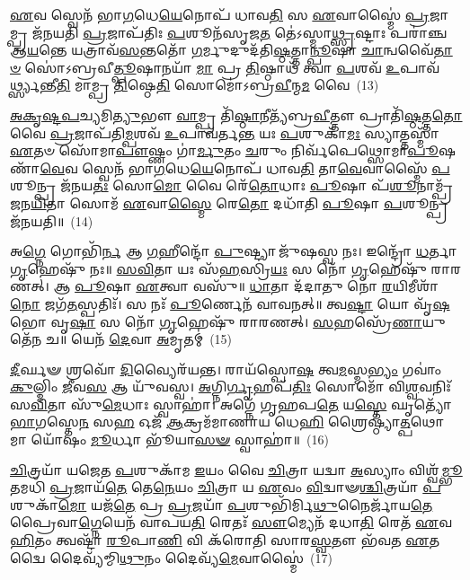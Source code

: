 \-\ul{𑌏}\-𑌵 𑌸𑍍𑌵𑍇𑌨᳴ 𑌭𑌾\-\ul{𑌗}\-𑌧𑍇\-\ul{𑌯𑍇}\-𑌨𑍋𑌪᳴ 𑌧𑌾𑌵\-\ul{𑌤𑌿} 𑌸 \ul{𑌏}\-𑌵𑌾𑌸𑍍𑌮𑍈॑ \ul{𑌪𑍍𑌰}\-𑌜𑌾𑌮𑍍𑌪𑍍𑌰 𑌜᳴𑌨𑌯𑌤𑌿 \ul{𑌪𑍍𑌰}\-𑌜𑌾𑌪᳴𑌤𑌿𑌃 \ul{𑌪}\-𑌶𑍂𑌨᳴𑌸𑍃𑌜\-\ul{𑌤} 𑌤𑍇॑\-𑌽𑌸𑍍𑌮𑌾\-\ul{𑌥𑍍𑌸𑍃}\-𑌷𑍍𑌟𑌾𑌃 𑌪𑌰𑌾॑𑌞𑍍𑌚 𑌆\-\ul{𑌯}\-𑌨𑍍𑌤𑍇 𑌯𑌤𑍍𑌰𑌾𑌵᳴\-\ul{𑌸}\-𑌨𑍍𑌤𑌤𑍋᳴ \ul{𑌗}\-𑌰𑍍𑌮𑍁𑌦𑍁𑌦᳴𑌤𑌿\-\ul{𑌷𑍍𑌠}\-𑌤𑍍𑌤𑌾\-\ul{𑌨𑍍𑌪𑍂}\-𑌷𑌾 \ul{𑌚𑌾}\-𑌨𑍍𑌵𑌵𑍈᳴\-\ul{𑌤𑌾}\-\-\ul{𑍞} 𑌸𑍋॑\-𑌽𑌬𑍍𑌰𑌵𑍀\-\ul{𑌤𑍍𑌪𑍂}\-𑌷𑌾𑌨𑌯𑌾᳴ \ul{𑌮𑌾} 𑌪𑍍𑌰 \ul{𑌤𑌿}\-𑌷𑍍𑌠𑌾𑌥᳴ 𑌤𑍍𑌵𑌾 \ul{𑌪}\-𑌶𑌵᳴ \ul{𑌉}\-𑌪𑌾𑌵᳴\-\ul{𑌰𑍍𑌥𑍍𑌸𑍍𑌯}\-𑌨𑍍𑌤𑍀\-\ul{𑌤𑌿} 𑌮𑌾𑌮𑍍𑌪𑍍𑌰 \ul{𑌤𑌿}\-𑌷𑍍𑌠𑍇\-\ul{𑌤𑌿} 𑌸𑍋𑌮𑍋॑\-𑌽𑌬𑍍𑌰\-\ul{𑌵𑍀}\-𑌨𑍍𑌮\-\ul{𑌮} 𑌵𑍈~(13)

\-\ul{𑌅}\-\-\ul{𑌕𑍃}\-\-\ul{𑌷𑍍𑌟}\-\-\ul{𑌪}\-𑌚𑍍𑌯𑌮𑌿\-\ul{𑌤𑍍𑌯𑍁}\-𑌭𑍗 \ul{𑌵𑌾}\-𑌮𑍍𑌪𑍍𑌰 𑌤𑌿᳴\-\ul{𑌷𑍍𑌠𑌾}\-𑌨𑍀𑌤𑍍𑌯᳴𑌬𑍍𑌰\-\ul{𑌵𑍀}\-𑌤𑍍𑌤𑍗 𑌪𑍍𑌰𑌾𑌤𑌿᳴\-\ul{𑌷𑍍𑌠}\-𑌤𑍍𑌤\-\ul{𑌤𑍋} 𑌵𑍈 \ul{𑌪𑍍𑌰}\-𑌜𑌾𑌪᳴𑌤𑌿\-\ul{𑌮𑍍𑌪}\-𑌶𑌵᳴ \ul{𑌉}\-𑌪𑌾𑌵᳴𑌰𑍍𑌤\-\ul{𑌨𑍍𑌤} 𑌯𑌃 \ul{𑌪}\-𑌶𑍁𑌕𑌾᳴\-\ul{𑌮𑌃} 𑌸𑍍𑌯𑌾𑌤𑍍𑌤𑌸𑍍𑌮𑌾᳴ \ul{𑌏}\-𑌤𑍞 𑌸𑍋᳴𑌮𑌾\-\ul{𑌪𑍗}\-𑌷𑍍𑌣𑌂 𑌗𑌾॑\-\ul{𑌰𑍍𑌮𑍁}\-𑌤𑌂 \ul{𑌚}\-𑌰𑍁𑌂 𑌨𑌿𑌰𑍍𑌵᳴𑌪𑍇𑌥𑍍𑌸𑍋𑌮𑌾\-\ul{𑌪𑍂}\-𑌷𑌣𑌾᳴\-\ul{𑌵𑍇}\-𑌵 𑌸𑍍𑌵𑍇𑌨᳴ 𑌭𑌾\-\ul{𑌗}\-𑌧𑍇\-\ul{𑌯𑍇}\-𑌨𑍋𑌪᳴ 𑌧𑌾𑌵\-\ul{𑌤𑌿} 𑌤𑌾\-\ul{𑌵𑍇}\-𑌵𑌾𑌸𑍍𑌮𑍈᳴ \ul{𑌪}\-𑌶𑍂𑌨𑍍𑌪𑍍𑌰 𑌜᳴𑌨𑌯\-\ul{𑌤𑌃} 𑌸𑍋\-\ul{𑌮𑍋} 𑌵𑍈 𑌰𑍇᳴\-\ul{𑌤𑍋}\-𑌧𑌾𑌃 \ul{𑌪𑍂}\-𑌷𑌾 𑌪᳴\-\ul{𑌶𑍂}\-𑌨𑌾𑌮𑍍𑌪𑍍𑌰᳴𑌜𑌨\-\ul{𑌯𑌿}\-𑌤𑌾 𑌸𑍋𑌮᳴ \ul{𑌏}\-𑌵𑌾\-\ul{𑌸𑍍𑌮𑍈} 𑌰𑍇\-\ul{𑌤𑍋} 𑌦𑌧𑌾᳴𑌤𑌿 \ul{𑌪𑍂}\-𑌷𑌾 \ul{𑌪}\-𑌶𑍂𑌨𑍍𑌪𑍍𑌰 𑌜᳴𑌨𑌯𑌤𑌿॥~(14)

{\anuvakamend[{\-\ul{𑌵}\-\-\ul{𑌪𑍇}\-\-\ul{𑌤𑍍𑌪𑍍𑌰}\-𑌜𑌾𑌪᳴\-\ul{𑌤𑌿𑌂} 𑌵𑍈 𑌦𑌧𑌾᳴𑌤𑌿 \ul{𑌪𑍂}\-𑌷𑌾 𑌤𑍍𑌰𑍀𑌣𑌿᳴ 𑌚}]}%

𑌅\-\ul{𑌗𑍍𑌨𑍇} 𑌗𑍋𑌭𑌿᳴\-\ul{𑌰𑍍𑌨} 𑌆 \ul{𑌗}\-𑌹𑍀𑌨𑍍𑌦𑍋᳴ \ul{𑌪𑍁}\-𑌷𑍍𑌟𑍍𑌯𑌾 𑌜𑍁᳴𑌷𑌸𑍍𑌵 𑌨𑌃। 𑌇𑌨𑍍𑌦𑍍𑌰𑍋᳴ \ul{𑌧}\-𑌰𑍍𑌤𑌾 \ul{𑌗𑍃}\-𑌹𑍇𑌷𑍁᳴ 𑌨𑌃॥ \ul{𑌸}\-\-\ul{𑌵𑌿}\-𑌤𑌾 𑌯𑌃 𑌸᳴\-\ul{𑌹}\-𑌸𑍍𑌰𑌿\-\ul{𑌯𑌃} 𑌸 𑌨𑍋᳴ \ul{𑌗𑍃}\-𑌹𑍇𑌷𑍁᳴ 𑌰𑌾𑌰𑌣𑌤𑍍। 𑌆 \ul{𑌪𑍂}\-𑌷𑌾 \ul{𑌏}\-𑌤𑍍𑌵𑌾 𑌵𑌸𑍁᳴॥ \ul{𑌧𑌾}\-𑌤𑌾 𑌦᳴𑌦𑌾𑌤𑍁 𑌨𑍋 \ul{𑌰}\-𑌯𑌿𑌮𑍀𑌶𑌾᳴\-\ul{𑌨𑍋} 𑌜𑌗᳴\-\ul{𑌤}\-𑌸𑍍𑌪𑌤𑌿𑌃᳴। 𑌸 𑌨𑌃᳴ \ul{𑌪𑍂}\-𑌰𑍍𑌣𑍇𑌨᳴ 𑌵𑌾𑌵𑌨𑌤𑍍॥ 𑌤𑍍𑌵\-\ul{𑌷𑍍𑌟𑌾} 𑌯𑍋 𑌵𑍃᳴\-\ul{𑌷}\-𑌭𑍋 𑌵𑍃\-\ul{𑌷𑌾} 𑌸 𑌨𑍋᳴ \ul{𑌗𑍃}\-𑌹𑍇𑌷𑍁᳴ 𑌰𑌾𑌰𑌣𑌤𑍍। \ul{𑌸}\-𑌹𑌸𑍍𑌰𑍇᳴\-\ul{𑌣𑌾}\-𑌯𑍁𑌤𑍇᳴𑌨 𑌚॥ 𑌯𑍇𑌨᳴ \ul{𑌦𑍇}\-𑌵𑌾 \ul{𑌅}\-𑌮𑍃𑌤𑌮𑍍॑~(15)

\-\ul{𑌦𑍀}\-𑌰𑍍𑌘𑍟 𑌶𑍍𑌰𑌵𑍋᳴ \ul{𑌦𑌿}\-𑌵𑍍𑌯𑍈𑌰᳴𑌯𑌨𑍍𑌤। 𑌰𑌾𑌯᳴𑌸𑍍𑌪𑍋\-\ul{𑌷} 𑌤𑍍𑌵\-\ul{𑌮}\-𑌸𑍍𑌮\-\ul{𑌭𑍍𑌯𑌂} 𑌗𑌵𑌾𑌂॑ \ul{𑌕𑍁}\-𑌲𑍍𑌮𑌿𑌂 \ul{𑌜𑍀}\-𑌵\-\ul{𑌸} 𑌆 𑌯𑍁᳴𑌵𑌸𑍍𑌵। \ul{𑌅}\-𑌗𑍍𑌨𑌿\-\ul{𑌰𑍍𑌗𑍃}\-𑌹𑌪᳴\-\ul{𑌤𑌿𑌃} 𑌸𑍋𑌮𑍋᳴ 𑌵𑌿\-\ul{𑌶𑍍𑌵}\-𑌵𑌨𑌿𑌃᳴ 𑌸\-\ul{𑌵𑌿}\-𑌤𑌾 𑌸𑍁᳴\-\ul{𑌮𑍇}\-𑌧𑌾𑌃 𑌸𑍍𑌵𑌾𑌹𑌾॑। 𑌅𑌗𑍍𑌨𑍇᳴ 𑌗𑍃𑌹𑌪\-\ul{𑌤𑍇} 𑌯\-\ul{𑌸𑍍𑌤𑍇} 𑌘𑍃𑌤𑍍𑌯𑍋᳴ \ul{𑌭𑌾}\-𑌗𑌸𑍍𑌤𑍇\-\ul{𑌨} 𑌸\-\ul{𑌹} 𑌓𑌜᳴ \ul{𑌆}\-𑌕𑍍𑌰𑌮᳴𑌮𑌾𑌣𑌾𑌯 𑌧𑍇\-\ul{𑌹𑌿} 𑌶𑍍𑌰𑍈𑌷𑍍𑌠𑍍𑌯𑌾॑\-\ul{𑌤𑍍𑌪}\-𑌥𑍋 𑌮𑌾 𑌯𑍋᳴𑌷𑌂 \ul{𑌮𑍂}\-𑌰𑍍𑌧𑌾 𑌭𑍂᳴𑌯𑌾\-\ul{𑌸}\-\-\ul{𑍟} 𑌸𑍍𑌵𑌾𑌹𑌾॑॥~(16)

{\anuvakamend[{\-\ul{𑌅}\-𑌮𑍃𑌤᳴\-\ul{𑌮}\-𑌷𑍍𑌟𑌾𑌤𑍍𑌰𑌿𑍞᳴𑌶𑌚𑍍𑌚}]}%

\-\ul{𑌚𑌿}\-𑌤𑍍𑌰𑌯𑌾᳴ 𑌯𑌜𑍇𑌤 \ul{𑌪}\-𑌶𑍁𑌕𑌾᳴𑌮 \ul{𑌇}\-𑌯𑌂 𑌵𑍈 \ul{𑌚𑌿}\-𑌤𑍍𑌰𑌾 𑌯𑌦𑍍𑌵𑌾 \ul{𑌅}\-𑌸𑍍𑌯𑌾𑌂 𑌵𑌿𑌶𑍍𑌵᳴\-\ul{𑌮𑍍𑌭𑍂}\-𑌤𑌮𑌧𑌿᳴ \ul{𑌪𑍍𑌰}\-𑌜𑌾𑌯᳴\-\ul{𑌤𑍇} 𑌤𑍇\-\ul{𑌨𑍇}\-𑌯𑌂 \ul{𑌚𑌿}\-𑌤𑍍𑌰𑌾 𑌯 \ul{𑌏}\-𑌵𑌂 \ul{𑌵𑌿}\-𑌦𑍍𑌵𑌾𑍟\-\ul{𑌶𑍍𑌚𑌿}\-𑌤𑍍𑌰𑌯𑌾᳴ \ul{𑌪}\-𑌶𑍁𑌕𑌾᳴\-\ul{𑌮𑍋} 𑌯𑌜᳴\-\ul{𑌤𑍇} 𑌪𑍍𑌰 \ul{𑌪𑍍𑌰}\-𑌜𑌯𑌾᳴ \ul{𑌪}\-𑌶𑍁𑌭𑌿᳴𑌰𑍍𑌮𑌿\-\ul{𑌥𑍁}\-𑌨𑍈𑌰𑍍𑌜𑌾᳴𑌯\-\ul{𑌤𑍇} 𑌪𑍍𑌰𑍈𑌵𑌾\-\ul{𑌗𑍍𑌨𑍇}\-𑌯𑍇𑌨᳴ 𑌵𑌾𑌪𑌯\-\ul{𑌤𑌿} 𑌰𑍇𑌤𑌃᳴ \ul{𑌸𑍗}\-𑌮𑍍𑌯𑍇𑌨᳴ 𑌦𑌧𑌾\-\ul{𑌤𑌿} 𑌰𑍇𑌤᳴ \ul{𑌏}\-𑌵 \ul{𑌹𑌿}\-𑌤𑌂 𑌤𑍍𑌵𑌷𑍍𑌟𑌾᳴ \ul{𑌰𑍂}\-𑌪𑌾\-\ul{𑌣𑌿} 𑌵𑌿 𑌕᳴𑌰𑍋𑌤𑌿 𑌸𑌾𑌰\-\ul{𑌸𑍍𑌵}\-𑌤𑍗 𑌭᳴𑌵𑌤 \ul{𑌏}\-𑌤𑌦𑍍𑌵𑍈 𑌦𑍈𑌵𑍍𑌯᳴𑌮𑍍𑌮𑌿\-\ul{𑌥𑍁}\-𑌨𑌂 𑌦𑍈𑌵𑍍𑌯᳴\-\ul{𑌮𑍇}\-𑌵𑌾𑌸𑍍𑌮𑍈॑~(17)

